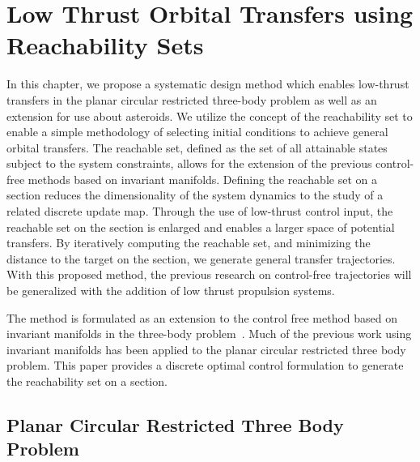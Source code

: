 
\chapter{Low Thrust Orbital Transfers using Reachability Sets}\label{sec:lowthrust_transfers}
In this chapter, we propose a systematic design method which enables low-thrust transfers in the planar circular restricted three-body problem as well as an extension for use about asteroids.
We utilize the concept of the reachability set to enable a simple methodology of selecting initial conditions to achieve general orbital transfers. 
The reachable set, defined as the set of all attainable states subject to the system constraints, allows for the extension of the previous control-free methods based on invariant manifolds.
Defining the reachable set on a \Poincare section reduces the dimensionality of the system dynamics to the study of a related discrete update map.
Through the use of low-thrust control input, the reachable set on the \Poincare section is enlarged and enables a larger space of potential transfers.
By iteratively computing the reachable set, and minimizing the distance to the target on the \Poincare section, we generate general transfer trajectories.
With this proposed method, the previous research on control-free trajectories will be generalized with the addition of low thrust propulsion systems.

The method is formulated as an extension to the control free method based on invariant manifolds in the three-body problem~\cite{koon2011}.
Much of the previous work using invariant manifolds has been applied to the planar circular restricted three body problem.
This paper provides a discrete optimal control formulation to generate the reachability set on a \Poincare section.

\section{Planar Circular Restricted Three Body Problem}

